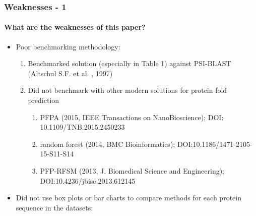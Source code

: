 \documentclass[xcolor={usenames,dvipsnames},hyperref={hyperindex,bookmarks}]{beamer}
\begin{document}
\frame
{
	\frametitle{Weaknesses - 1}
	\framesubtitle{What are the weaknesses of this paper?}

	\begin{itemize}
	\item Poor benchmarking methodology: 
		\begin{enumerate} 
		\item Benchmarked solution (especially in Table 1) against PSI-BLAST (Altschul S.F. et al. , 1997)
		\item Did not benchmark with other modern solutions for protein fold prediction
			\begin{enumerate} 
			\item PFPA (2015, IEEE Transactions on NanoBioscience); DOI: 10.1109/TNB.2015.2450233
			\item random forest (2014, BMC Bioinformatics); DOI:10.1186/1471-2105-15-S11-S14
			\item PFP-RFSM (2013, J. Biomedical Science and Engineering); DOI:10.4236/jbise.2013.612145 
			\end{enumerate}
		\end{enumerate}
	\item Did not use box plots or bar charts to compare methods for each protein sequence in the datasets:
	\end{itemize}
}
\end{document}
